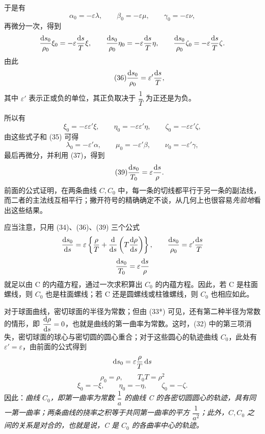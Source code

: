 于是有
\begin{equation}\tag{35}
\alpha_0=-\varepsilon\lambda,
\qquad
\beta_0=-\varepsilon\mu,
\qquad
\gamma_0=-\varepsilon\nu,
\end{equation}
再微分一次，得到
\[
\frac{\mathrm{d} s_0}{\rho_0}\xi_0=-\varepsilon\frac{\mathrm{d} s}{T}\xi,
\qquad
\frac{\mathrm{d} s_0}{\rho_0}\eta_0=-\varepsilon\frac{\mathrm{d} s}{T}\eta,
\qquad
\frac{\mathrm{d} s_0}{\rho_0}\zeta_0=-\varepsilon\frac{\mathrm{d} s}{T}\zeta.
\]
由此
\begin{equation}\tag{36}
\frac{\mathrm{d} s_0}{\rho_0}=\varepsilon'\frac{\mathrm{d} s}{T},
\end{equation}
其中 \(\varepsilon'\) 表示正或负的单位，其正负取决于 \(\dfrac{1}{T}\) 为正还是为负。

所以有
\begin{equation}\tag{37}
\xi_0=-\varepsilon\varepsilon'\xi,
\qquad
\eta_0=-\varepsilon\varepsilon'\eta,
\qquad
\zeta_0=-\varepsilon\varepsilon'\zeta,
\end{equation}
由这些式子和 (35) 可得
\begin{equation}\tag{38}
\lambda_0=-\varepsilon'\alpha,
\qquad
\mu_0=-\varepsilon'\beta,
\qquad
\nu_0=-\varepsilon'\gamma,
\end{equation}
最后再微分，并利用 (37)，得到
\begin{equation}\tag{39}
\frac{\mathrm{d} s_0}{T_0}=\varepsilon\frac{\mathrm{d} s}{\rho}.
\end{equation}
前面的公式证明，在两条曲线 \(C,C_0\) 中，每一条的切线都平行于另一条的副法线，而二者的主法线互相平行；撇开符号的精确确定不谈，从几何上也很容易\emph{先验地}看出这些结果。

应当注意，只用 (34)、(36)、(39) 三个公式
\[
\frac{\mathrm{d} s_0}{\mathrm{d} s}=\varepsilon\left\{\frac{\rho}{T}+\frac{\mathrm{d}}{\mathrm{d} s}\left(T\frac{\mathrm{d}\rho}{\mathrm{d} s}\right)\right\},
\qquad
\frac{\mathrm{d} s_0}{\rho_0}=\varepsilon'\frac{\mathrm{d} s}{T}
\]
\[
\frac{\mathrm{d} s_0}{T_0}=\varepsilon\frac{\mathrm{d} s}{\rho}
\]
就足以由 C 的内蕴方程，通过一次求积算出 \(C_0\) 的内蕴方程。因此，若 C 是柱面螺线，则 \(C_0\) 也是柱面螺线；若 C 还是圆螺线或柱锥螺线，则 \(C_0\) 也相应如此。

对于球面曲线，密切球面的半径为常数；但由 (33*) 可见，还有第二种半径为常数的情形，即 \(\dfrac{\mathrm{d}\rho}{\mathrm{d} s}=0\)，也就是曲线的第一曲率为常数。这时，(32) 中的第三项消失，密切球面的球心与密切圆的圆心重合；对于这些圆心的轨迹曲线 \(C_0\)，此处有 \(\varepsilon'=\varepsilon\)，由前面的公式得到
\[
\mathrm{d} s_0=\varepsilon\frac{\rho}{T}\,\mathrm{d} s
\]
\[
\rho_0=\rho,
\qquad
T_0T=\rho^2
\]
\[
\xi_0=-\xi,
\qquad
\eta_0=-\eta,
\qquad
\zeta_0=-\zeta.
\]
因此：\emph{曲线 \(C_0\)，即第一曲率为常数 \(\dfrac{1}{a}\) 的曲线 C 的各密切圆圆心的轨迹，具有同一第一曲率；两条曲线的挠率之积等于共同第一曲率的平方 \(\dfrac{1}{a^2}\)；此外，\(C,C_0\) 之间的关系是对合的，也就是说，C 是 \(C_0\) 的各曲率中心的轨迹。}

